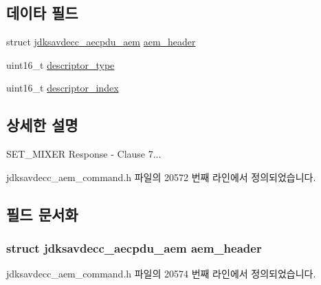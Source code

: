 \subsection*{데이타 필드}
\begin{DoxyCompactItemize}
\item 
struct \hyperlink{structjdksavdecc__aecpdu__aem}{jdksavdecc\+\_\+aecpdu\+\_\+aem} \hyperlink{structjdksavdecc__aem__command__set__mixer__response_ae1e77ccb75ff5021ad923221eab38294}{aem\+\_\+header}
\item 
uint16\+\_\+t \hyperlink{structjdksavdecc__aem__command__set__mixer__response_ab7c32b6c7131c13d4ea3b7ee2f09b78d}{descriptor\+\_\+type}
\item 
uint16\+\_\+t \hyperlink{structjdksavdecc__aem__command__set__mixer__response_a042bbc76d835b82d27c1932431ee38d4}{descriptor\+\_\+index}
\end{DoxyCompactItemize}


\subsection{상세한 설명}
S\+E\+T\+\_\+\+M\+I\+X\+ER Response -\/ Clause 7... 

jdksavdecc\+\_\+aem\+\_\+command.\+h 파일의 20572 번째 라인에서 정의되었습니다.



\subsection{필드 문서화}
\subsubsection[{\texorpdfstring{aem\+\_\+header}{aem_header}}]{\setlength{\rightskip}{0pt plus 5cm}struct {\bf jdksavdecc\+\_\+aecpdu\+\_\+aem} aem\+\_\+header}\hypertarget{structjdksavdecc__aem__command__set__mixer__response_ae1e77ccb75ff5021ad923221eab38294}{}\label{structjdksavdecc__aem__command__set__mixer__response_ae1e77ccb75ff5021ad923221eab38294}


jdksavdecc\+\_\+aem\+\_\+command.\+h 파일의 20574 번째 라인에서 정의되었습니다.

